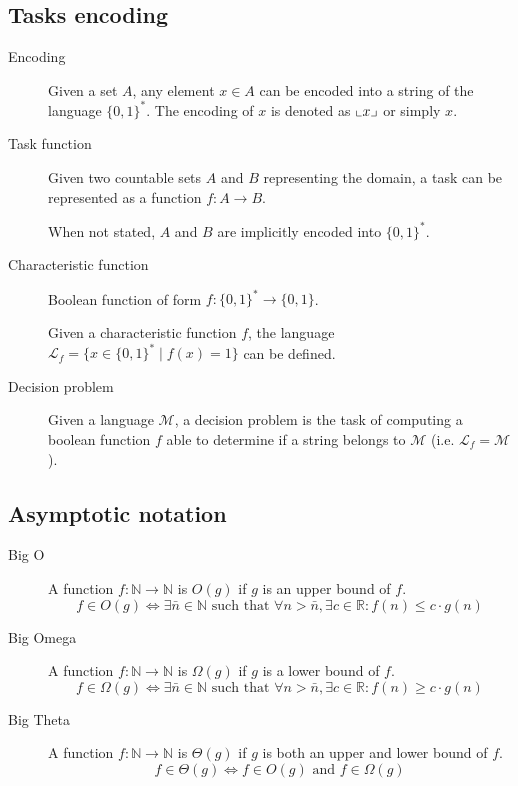 \subsection{Tasks encoding}

\begin{description}
    \item[Encoding] 
        Given a set $A$, any element $x \in A$ can be encoded into a string of the language $\{0, 1\}^*$.
        The encoding of $x$ is denoted as ${\llcorner{x}\lrcorner}$ or simply $x$.

    \item[Task function] 
        Given two countable sets $A$ and $B$ representing the domain,
        a task can be represented as a function $f: A \rightarrow B$.

        When not stated, $A$ and $B$ are implicitly encoded into $\{0, 1\}^*$.

    \item[Characteristic function] 
        Boolean function of form $f: \{0, 1\}^* \rightarrow \{0, 1\}$.

        Given a characteristic function $f$, the language $\mathcal{L}_f = \{ x \in \{0, 1\}^* \mid f(x) = 1 \}$
        can be defined.

    \item[Decision problem] 
        Given a language $\mathcal{M}$, a decision problem is the task of computing a boolean function $f$ 
        able to determine if a string belongs to $\mathcal{M}$ (i.e. $\mathcal{L}_f = \mathcal{M}$).
\end{description}


\subsection{Asymptotic notation}

\begin{description}
    \item[Big O] 
        A function $f: \mathbb{N} \rightarrow \mathbb{N}$ is $O(g)$ if $g$ is an upper bound of $f$.
        \[ f \in O(g) \iff \exists \bar{n} \in \mathbb{N} \text{ such that } \forall n > \bar{n}, \exists c \in \mathbb{R}: f(n) \leq c \cdot g(n) \]
    
    \item[Big Omega] 
        A function $f: \mathbb{N} \rightarrow \mathbb{N}$ is $\Omega(g)$ if $g$ is a lower bound of $f$.
        \[ f \in \Omega(g) \iff \exists \bar{n} \in \mathbb{N} \text{ such that } \forall n > \bar{n}, \exists c \in \mathbb{R}: f(n) \geq c \cdot g(n) \]

    \item[Big Theta]
        A function $f: \mathbb{N} \rightarrow \mathbb{N}$ is $\Theta(g)$ if $g$ is both an upper and lower bound of $f$.
        \[ f \in \Theta(g) \iff f \in O(g) \text{ and } f \in \Omega(g) \]
    
\end{description}